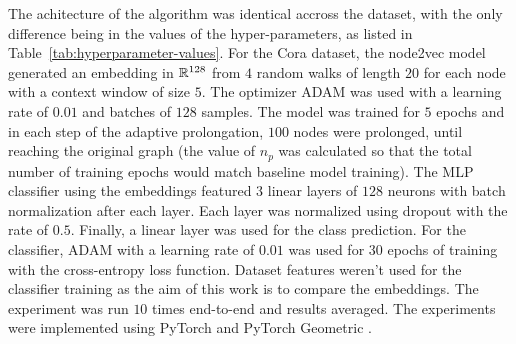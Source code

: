 The achitecture of the algorithm was identical accross the dataset, with the only difference being in the values of the hyper-parameters, as listed in Table~\ref{tab:hyperparameter-values}. For the Cora dataset, the node2vec model generated an embedding in \( \mathbb{R}^{128} \) from \( 4 \) random walks of length \( 20 \) for each node with a context window of size \( 5 \). The optimizer ADAM \cite{kingma_adam:_2017} was used with a learning rate of \( 0.01 \) and batches of \( 128 \) samples. The model was trained for \( 5 \) epochs and in each step of the adaptive prolongation, \( 100 \) nodes were prolonged, until reaching the original graph (the value of \( n_p \) was calculated so that the total number of training epochs would match baseline model training). The MLP classifier using the embeddings featured \( 3 \) linear layers of \( 128 \) neurons with batch normalization after each layer. Each layer was normalized using dropout \cite{srivastava_dropout_2014} with the rate of \( 0.5 \). Finally, a linear layer was used for the class prediction. For the classifier, ADAM with a learning rate of \( 0.01 \) was used for \( 30 \) epochs of training with the cross-entropy loss function. Dataset features weren't used for the classifier training as the aim of this work is to compare the embeddings. The experiment was run \( 10 \) times end-to-end and results averaged. The experiments were implemented using PyTorch \cite{paszke_pytorch_2019} and PyTorch Geometric \cite{fey_fast_2019}.

